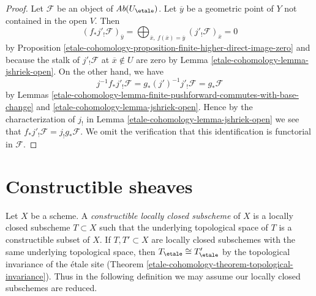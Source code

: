 \begin{proof}
Let $\mathcal{F}$ be an object of $\textit{Ab}(U_\etale)$.
Let $\overline{y}$ be a geometric point of $Y$ not contained
in the open $V$. Then
$$
(f_*j'_!\mathcal{F})_{\overline{y}} =
\bigoplus\nolimits_{\overline{x},\ f(\overline{x}) = \overline{y}}
(j'_!\mathcal{F})_{\overline{x}} = 0
$$
by Proposition \ref{etale-cohomology-proposition-finite-higher-direct-image-zero} and
because the stalk of $j'_!\mathcal{F}$ at $\overline{x} \not \in U$
are zero by Lemma \ref{etale-cohomology-lemma-jshriek-open}. On the other hand, we have
$$
j^{-1}f_*j'_!\mathcal{F} =
g_*(j')^{-1}j'_!\mathcal{F} =
g_*\mathcal{F}
$$
by Lemmas \ref{etale-cohomology-lemma-finite-pushforward-commutes-with-base-change} and
\ref{etale-cohomology-lemma-jshriek-open}.
Hence by the characterization of
$j_!$ in Lemma \ref{etale-cohomology-lemma-jshriek-open} we see that
$f_*j'_!\mathcal{F} = j_!g_*\mathcal{F}$.
We omit the verification that this identification
is functorial in $\mathcal{F}$.
\end{proof}

\section{Constructible sheaves}
\label{etale-cohomology-section-constructible}
Let $X$ be a scheme. A {\it constructible locally closed subscheme} of $X$
is a locally closed subscheme $T \subset X$ such that the underlying
topological space of $T$ is a constructible subset of $X$.
If $T, T' \subset X$ are locally
closed subschemes with the same underlying topological space, then
$T_\etale \cong T'_\etale$ by the topological
invariance of the \'etale site (Theorem \ref{etale-cohomology-theorem-topological-invariance}).
Thus in the following definition we may assume our locally closed
subschemes are reduced.

